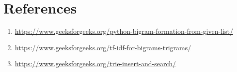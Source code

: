 \documentclass{article}
\begin{document}
\section*{References}
\begin{enumerate}
    \item \url{https://www.geeksforgeeks.org/python-bigram-formation-from-given-list/}
    \item \url{https://www.geeksforgeeks.org/tf-idf-for-bigrams-trigrams/}
    \item \url{https://www.geeksforgeeks.org/trie-insert-and-search/}
\end{enumerate}
\end{document}
